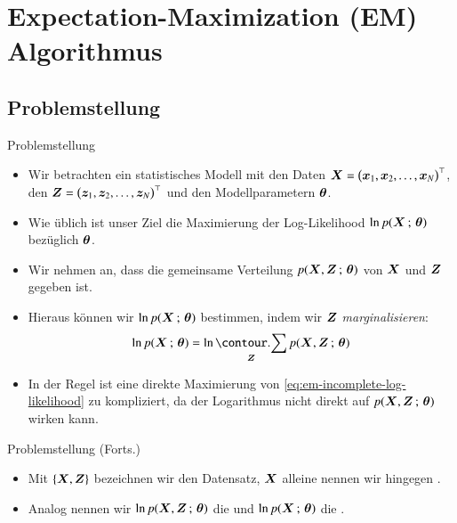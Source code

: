 \section{Expectation-Maximization (EM) Algorithmus}

\divider

\subsection{Problemstellung}

\begin{frame}{Problemstellung}{}
	\begin{itemize}
		\item Wir betrachten ein statistisches Modell mit den Daten $\bm{X} = \bigl( \bm{x}_1, \bm{x}_2, \ldots, \bm{x}_N \bigr)^\top$,
			den  $\bm{Z} = \bigl( \bm{z}_1, \bm{z}_2, \ldots, \bm{z}_N \bigr)^\top$ und den Modellparametern $\bm{\theta}$.
		\item Wie üblich ist unser Ziel die Maximierung der Log-Likelihood $\ln p(\bm{X} \,;\, \bm{\theta})$ bezüglich $\bm{\theta}$.
		\item Wir nehmen an, dass die gemeinsame Verteilung $p(\bm{X}, \bm{Z} \,;\, \bm{\theta})$ von $\bm{X}$ und $\bm{Z}$ gegeben ist.
		\item Hieraus können wir $\ln p(\bm{X} \,;\, \bm{\theta})$ bestimmen, indem wir $\bm{Z}$ \textit{marginalisieren}:
		\begin{equation} \label{eq:em-incomplete-log-likelihood}
			\ln p(\bX \param \btheta) = \ln \sum_{\bZ} p(\bX, \bZ \param \btheta)
		\end{equation}
		\item In der Regel ist eine direkte Maximierung von \eqref{eq:em-incomplete-log-likelihood} zu kompliziert,
			da der Logarithmus nicht direkt auf $p(\bm{X}, \bm{Z} \,;\, \bm{\theta})$ wirken kann.
	\end{itemize}
\end{frame}


\begin{frame}{Problemstellung (Forts.)}{}
	\begin{itemize}
		\item Mit $\{ \bm{X}, \bm{Z} \}$ bezeichnen wir den  Datensatz, $\bm{X}$ alleine nennen wir
			hingegen .
		\item Analog nennen wir $\ln p(\bm{X}, \bm{Z} \,;\, \bm{\theta})$ die  und
			$\ln p(\bm{X} \,;\, \bm{\theta})$ die .
	\end{itemize}
\end{frame}



